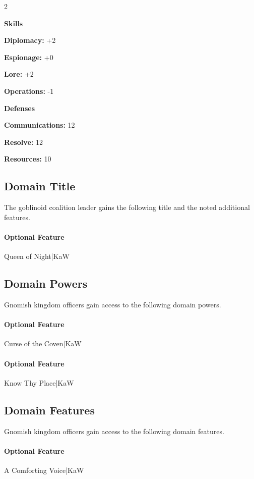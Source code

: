 \documentclass[10pt,a4paper,twoside,bg=print,twocolumn,openany,nodeprecatedcode]{dndbook}
\begin{document}
\begin{itemize}
\begin{multicols}{2}
\item \textbf{Skills}
\item \textbf{Diplomacy:} +2
\item \textbf{Espionage:} +0
\item \textbf{Lore:} +2
\item \textbf{Operations:} -1
\item \textbf{Defenses}
\item \textbf{Communications:} 12
\item \textbf{Resolve:} 12
\item \textbf{Resources:} 10
\end{multicols}

\end{itemize}

\subsection{Domain Title}
The goblinoid coalition leader gains the following title and the noted additional features.

\paragraph{Optional Feature}
Queen of Night|KaW

\subsection{Domain Powers}
Gnomish kingdom officers gain access to the following domain powers.

\paragraph{Optional Feature}
Curse of the Coven|KaW

\paragraph{Optional Feature}
Know Thy Place|KaW

\subsection{Domain Features}
Gnomish kingdom officers gain access to the following domain features.

\paragraph{Optional Feature}
A Comforting Voice|KaW
\end{document}
